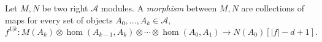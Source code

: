 
 
 
Let $M, N$ be two right $\mathcal A$ modules. A \emph{morphism} between $M, N$ are collections of maps for every set of objects $A_0, \ldots, A_k\in \mathcal A$,
\[f^{1|k}: M(A_k)\otimes \hom(A_{k-1}, A_k)\otimes \cdots \otimes \hom(A_0, A_1)\to N(A_0)[|f|-d+1].\]

 